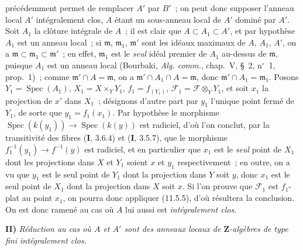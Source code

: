 
précédemment permet de remplacer $A'$ par $B'$~; on peut donc supposer l'anneau
local $A'$ intégralement clos, $A$ étant un sous-anneau local de $A'$ dominé par
$A'$. Soit $A_1$ la clôture intégrale de $A$~; il est clair que
$A\subset A_1\subset A'$, et par hypothèse $A_1$ est un anneau local~; si
$\mathfrak m$, $\mathfrak m_1$, $\mathfrak m'$ sont les idéaux maximaux de
$A$, $A_1$, $A'$, on a $\mathfrak m\subset\mathfrak m_1\subset\mathfrak m'$~;
en effet, $\mathfrak m_1$ est le \emph{seul} idéal premier de $A_1$ au-dessus de
$\mathfrak m$, puisque $A_1$ est un anneau local (Bourbaki,
\emph{Alg. comm.}, chap.~V, \S~2, n$^\circ$~1, prop.~1)~; comme
$\mathfrak m'\cap A=\mathfrak m$, on a
$\mathfrak m'\cap A_1\cap A=\mathfrak m$, donc
$\mathfrak m'\cap A_1=\mathfrak m_1$. Posons
$Y_1=\operatorname{Spec}(A_1)$, $X_1=X\times_Y Y_1$, $f_1=f_{(Y_1)}$,
$\mathcal F_1=\mathcal F\otimes_Y Y_1$, et soit $x_1$ la projection de $x'$ dans
$X_1$~; désignons d'autre part par $y_1$ l'unique point fermé de $Y_1$, de sorte
que $y_1=f_1(x_1)$. Par hypothèse le morphisme
$\operatorname{Spec}(k(y_1))\to\operatorname{Spec}(k(y))$ est radiciel, d'où
l'on conclut, par la transitivité des fibres (\textbf I, 3.6.4) et
(\textbf I, 3.5.7), que le morphisme $f_1^{-1}(y_1)\to f^{-1}(y)$ est radiciel,
et en particulier que $x_1$ est le \emph{seul} point de $X_1$ dont les
projections dans $X$ et $Y_1$ soient $x$ et $y_1$ respectivement~; en outre, on
a vu que $y_1$ est le seul point de $Y_1$ dont la projection dans $Y$ soit $y$,
donc $x_1$ est le seul point de $X_1$ dont la projection dans $X$ soit $x$. Si
l'on prouve que $\mathcal F_1$ est $f_1$-plat au point $x_1$, on pourra donc
appliquer (11.5.5), d'où résultera la conclusion. On est donc ramené au cas où
$A$ lui aussi est \emph{intégralement clos}.

\medskip
\noindent\textbf{II)} \emph{Réduction au cas où $A$ et $A'$ sont des anneaux
locaux de $\mathbf Z$-algèbres de type fini intégralement clos.}

